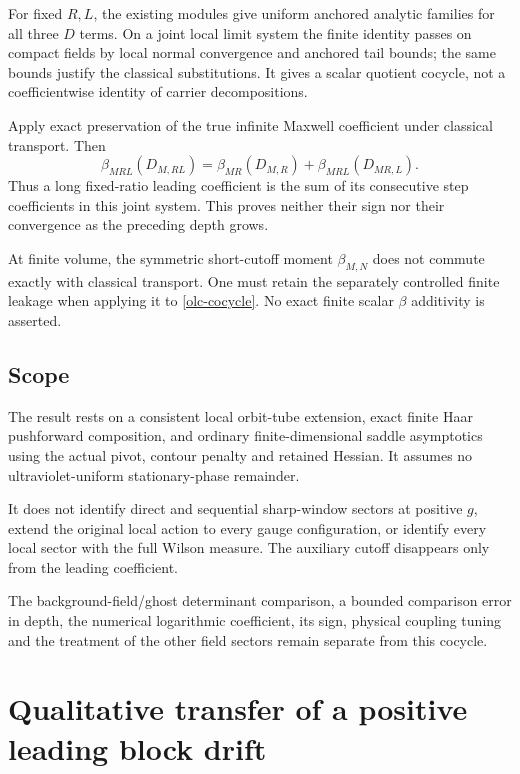 \documentclass[11pt]{article}
\theoremstyle{remark}
\begin{document}
For fixed $R,L$, the existing modules give uniform anchored
analytic families for all three $D$ terms. On a joint local
limit system the finite identity passes on compact fields
by local normal convergence and anchored tail bounds;
the same bounds justify the classical substitutions.
It gives a scalar quotient cocycle, not a coefficientwise
identity of carrier decompositions.

Apply exact preservation of the true infinite Maxwell
coefficient under classical transport. Then
\begin{equation}
 \beta_{MRL}(D_{M,RL})
   =\beta_{MR}(D_{M,R})+\beta_{MRL}(D_{MR,L}).
 \label{olc-Maxwell-cocycle}
\end{equation}
Thus a long fixed-ratio leading coefficient is the sum of
its consecutive step coefficients in this joint system.
This proves neither their sign nor their convergence as
the preceding depth grows.

At finite volume, the symmetric short-cutoff moment
$\beta_{M,N}$ does not commute exactly with classical
transport. One must retain the separately controlled
finite leakage when applying it to
\eqref{olc-cocycle}. No exact finite scalar
$\beta$ additivity is asserted.

\subsection{Scope}
\label{olc-scope-section}

The result rests on a consistent local orbit-tube extension,
exact finite Haar pushforward composition, and ordinary
finite-dimensional saddle asymptotics using the actual
pivot, contour penalty and retained Hessian. It assumes
no ultraviolet-uniform stationary-phase remainder.

It does not identify direct and sequential sharp-window
sectors at positive $g$, extend the original local action
to every gauge configuration, or identify every local
sector with the full Wilson measure. The auxiliary cutoff
disappears only from the leading coefficient.

The background-field/ghost determinant comparison, a
bounded comparison error in depth, the numerical
logarithmic coefficient, its sign, physical coupling
tuning and the treatment of the other field sectors
remain separate from this cocycle.


\section{Qualitative transfer of a positive leading block drift}
\label{fbt-section}
\end{document}
